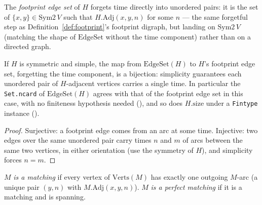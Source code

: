 \begin{definition}
  \label{def:subgraph-footprint-edgeSet}
  \leanok
  The \emph{footprint edge set} of $H$ forgets time directly into unordered
  pairs: it is the set of $\{x,y\} \in \mathrm{Sym2}\,V$ such that
  $H.\mathrm{Adj}(x,y,n)$ for some $n$ — the same forgetful step as
  Definition~\ref{def:footprint}'s footprint digraph, but landing on
  $\mathrm{Sym2}\,V$ (matching the shape of $\mathrm{EdgeSet}$ without the
  time component) rather than on a directed graph.
\end{definition}

\begin{lemma}
  \label{lem:edgeSet-footprint-bijective}
  \leanok
  If $H$ is symmetric and simple, the map from $\mathrm{EdgeSet}(H)$ to
  $H$'s footprint edge set, forgetting the time component, is a bijection:
  simplicity guarantees each unordered pair of $H$-adjacent vertices carries
  a single time. In particular the \texttt{Set.ncard} of $\mathrm{EdgeSet}(H)$
  agrees with that of the footprint edge set in this case, with no
  finiteness hypothesis needed
  (), and so does
  $H.\mathrm{size}$ under a \texttt{Fintype} instance
  ().
\end{lemma}

\begin{proof}
  \leanok
  Surjective: a footprint edge comes from an arc at some time. Injective: two edges over the same unordered pair carry times $n$ and $m$ of arcs between the same two vertices, in either orientation (use the symmetry of $H$), and simplicity forces $n = m$.
\end{proof}

\begin{definition}[Matching]
  \label{def:subgraph-matching}
  \leanok
  $M$ \emph{is a matching} if every vertex of $\mathrm{Verts}(M)$ has exactly
  one outgoing $M$-arc (a unique pair $(y,n)$ with $M.\mathrm{Adj}(x,y,n)$).
  $M$ \emph{is a perfect matching} if it is a matching and is spanning.
\end{definition}

